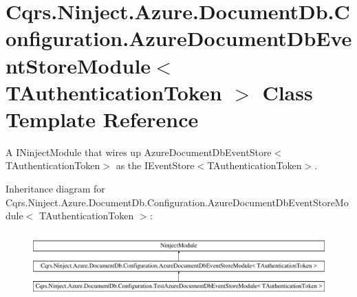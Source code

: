 \hypertarget{classCqrs_1_1Ninject_1_1Azure_1_1DocumentDb_1_1Configuration_1_1AzureDocumentDbEventStoreModule}{}\section{Cqrs.\+Ninject.\+Azure.\+Document\+Db.\+Configuration.\+Azure\+Document\+Db\+Event\+Store\+Module$<$ T\+Authentication\+Token $>$ Class Template Reference}
\label{classCqrs_1_1Ninject_1_1Azure_1_1DocumentDb_1_1Configuration_1_1AzureDocumentDbEventStoreModule}


A I\+Ninject\+Module that wires up Azure\+Document\+Db\+Event\+Store$<$\+T\+Authentication\+Token$>$ as the I\+Event\+Store$<$\+T\+Authentication\+Token$>$.  


Inheritance diagram for Cqrs.\+Ninject.\+Azure.\+Document\+Db.\+Configuration.\+Azure\+Document\+Db\+Event\+Store\+Module$<$ T\+Authentication\+Token $>$\+:\begin{figure}[H]
\begin{center}
\leavevmode
\includegraphics[height=2.526316cm]{classCqrs_1_1Ninject_1_1Azure_1_1DocumentDb_1_1Configuration_1_1AzureDocumentDbEventStoreModule}
\end{center}
\end{figure}
